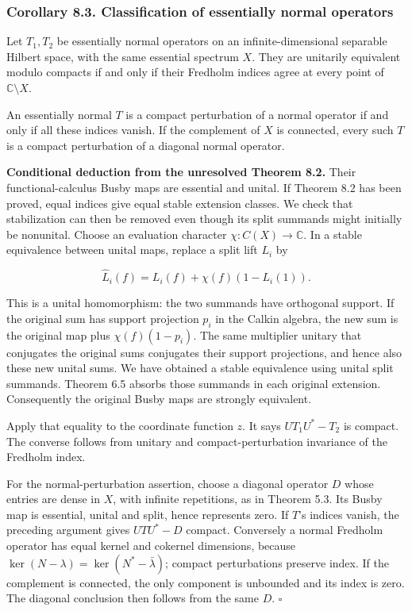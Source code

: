 \documentclass[
  11pt,
]{article}
\begin{document}
\subsubsection{Corollary 8.3. Classification of essentially normal
operators}\label{corollary-8.3.-classification-of-essentially-normal-operators}

Let \(T_1,T_2\) be essentially normal operators on an
infinite-dimensional separable Hilbert space, with the same essential
spectrum \(X\). They are unitarily equivalent modulo compacts if and
only if their Fredholm indices agree at every point of
\(\mathbb C\setminus X\).

An essentially normal \(T\) is a compact perturbation of a normal
operator if and only if all these indices vanish. If the complement of
\(X\) is connected, every such \(T\) is a compact perturbation of a
diagonal normal operator.

\textbf{Conditional deduction from the unresolved Theorem 8.2.} Their
functional-calculus Busby maps are essential and unital. If Theorem 8.2
has been proved, equal indices give equal stable extension classes. We
check that stabilization can then be removed even though its split
summands might initially be nonunital. Choose an evaluation character
\(\chi:C(X)\to\mathbb C\). In a stable equivalence between unital maps,
replace a split lift \(L_i\) by

\[
\widehat L_i(f)=L_i(f)+\chi(f)(1-L_i(1)).
\]

This is a unital homomorphism: the two summands have orthogonal support.
If the original sum has support projection \(p_i\) in the Calkin
algebra, the new sum is the original map plus \(\chi(f)(1-p_i)\). The
same multiplier unitary that conjugates the original sums conjugates
their support projections, and hence also these new unital sums. We have
obtained a stable equivalence using unital split summands. Theorem 6.5
absorbs those summands in each original extension. Consequently the
original Busby maps are strongly equivalent.

Apply that equality to the coordinate function \(z\). It says
\(UT_1U^*-T_2\) is compact. The converse follows from unitary and
compact-perturbation invariance of the Fredholm index.

For the normal-perturbation assertion, choose a diagonal operator \(D\)
whose entries are dense in \(X\), with infinite repetitions, as in
Theorem 5.3. Its Busby map is essential, unital and split, hence
represents zero. If \(T\)'s indices vanish, the preceding argument gives
\(UTU^*-D\) compact. Conversely a normal Fredholm operator has equal
kernel and cokernel dimensions, because
\(\ker(N-\lambda)=\ker(N^*-\bar\lambda)\); compact perturbations
preserve index. If the complement is connected, the only component is
unbounded and its index is zero. The diagonal conclusion then follows
from the same \(D\). \(\square\)
\end{document}
